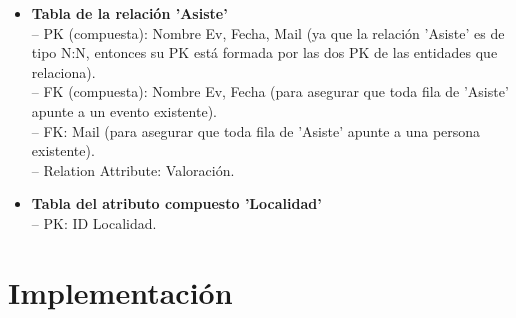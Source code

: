 \documentclass[12pt]{article}
\begin{document}
\begin{itemize}
        \item \textbf{Tabla de la relación 'Asiste'} \\
            -- PK (compuesta): Nombre Ev, Fecha, Mail (ya que la relación 'Asiste' es de tipo N:N, entonces su PK está formada por las dos PK de las 
            entidades que relaciona). \\
            -- FK (compuesta): Nombre Ev, Fecha (para asegurar que toda fila de 'Asiste' apunte a un evento existente). \\
            -- FK: Mail (para asegurar que toda fila de 'Asiste' apunte a una persona existente). \\
            -- Relation Attribute: Valoración.
            
        \item \textbf{Tabla del atributo compuesto 'Localidad'} \\
            -- PK: ID Localidad.

    \end{itemize}

    \newpage
    \section{Implementación}
\end{document}

